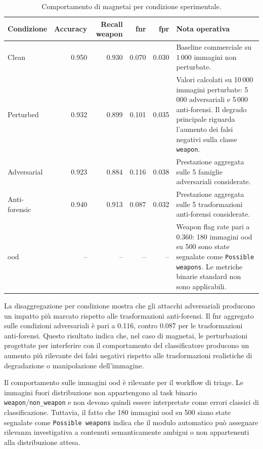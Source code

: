 \begin{table}[H]
\centering
\caption{Comportamento di \gls{magnetai} per condizione sperimentale.}
\label{tab:results-magnet-condition-metrics}
\small
\begin{tabularx}{\textwidth}{@{}l r r r r X@{}}
\toprule
\textbf{Condizione} &
\textbf{Accuracy} &
\textbf{Recall weapon} &
\textbf{\gls{fnr}} &
\textbf{\gls{fpr}} &
\textbf{Nota operativa} \\
\midrule

Clean &
0.950 &
0.930 &
0.070 &
0.030 &
Baseline commerciale su 1\,000 immagini non perturbate. \\

Perturbed &
0.932 &
0.899 &
0.101 &
0.035 &
Valori calcolati su 10\,000 immagini perturbate: 5\,000 adversariali e 5\,000
anti-forensi. Il degrado principale riguarda l'aumento dei falsi negativi sulla
classe \texttt{weapon}. \\

Adversarial &
0.923 &
0.884 &
0.116 &
0.038 &
Prestazione aggregata sulle 5 famiglie adversariali considerate. \\

Anti-forensic &
0.940 &
0.913 &
0.087 &
0.032 &
Prestazione aggregata sulle 5 trasformazioni anti-forensi considerate. \\

\gls{ood} &
-- &
-- &
-- &
-- &
Weapon flag rate pari a 0.360: 180 immagini \gls{ood} su 500 sono state
segnalate come \texttt{Possible weapons}. Le metriche binarie standard non sono
applicabili. \\

\bottomrule
\end{tabularx}
\end{table}

La disaggregazione per condizione mostra che gli attacchi adversariali producono
un impatto più marcato rispetto alle trasformazioni anti-forensi. Il \gls{fnr}
aggregato sulle condizioni adversariali è pari a 0.116, contro 0.087 per le
trasformazioni anti-forensi. Questo risultato indica che, nel caso di
\gls{magnetai}, le perturbazioni progettate per interferire con il comportamento
del classificatore producono un aumento più rilevante dei falsi negativi rispetto
alle trasformazioni realistiche di degradazione o manipolazione dell'immagine.

Il comportamento sulle immagini \gls{ood} è rilevante per il workflow di triage.
Le immagini fuori distribuzione non appartengono al task binario
\texttt{weapon}/\texttt{non\_weapon} e non devono quindi essere interpretate come
errori classici di classificazione. Tuttavia, il fatto che 180 immagini
\gls{ood} su 500 siano state segnalate come \texttt{Possible weapons} indica che
il modulo automatico può assegnare rilevanza investigativa a contenuti
semanticamente ambigui o non appartenenti alla distribuzione attesa.

